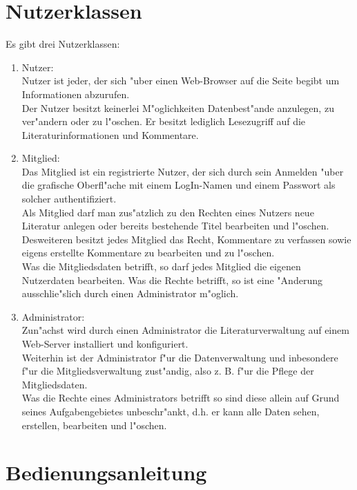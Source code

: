 \section{Nutzerklassen}
Es gibt drei Nutzerklassen:
\begin{enumerate}
\item Nutzer:\\
Nutzer ist jeder, der sich "uber einen Web-Browser auf die Seite begibt um Informationen abzurufen.\\
Der Nutzer besitzt keinerlei M"oglichkeiten Datenbest"ande anzulegen, zu ver"andern oder zu l"oschen. Er besitzt lediglich Lesezugriff auf die Literaturinformationen und Kommentare. \\

\item Mitglied:\\
Das Mitglied ist ein registrierte Nutzer, der sich durch sein Anmelden "uber die grafische Oberfl"ache mit einem LogIn-Namen und einem Passwort als solcher authentifiziert.\\
Als Mitglied darf man zus"atzlich zu den Rechten eines Nutzers neue Literatur anlegen oder bereits bestehende Titel bearbeiten und l"oschen.\\
Desweiteren besitzt jedes Mitglied das Recht, Kommentare zu verfassen sowie eigens erstellte Kommentare zu bearbeiten und zu l"oschen.\\
Was die Mitgliedsdaten betrifft, so darf jedes Mitglied die eigenen Nutzerdaten bearbeiten. Was die Rechte betrifft, so ist eine "Anderung ausschlie"slich durch einen Administrator m"oglich.\\

\item Administrator:\\
Zun"achst wird durch einen Administrator die Literaturverwaltung auf einem Web-Server installiert und konfiguriert.\\
Weiterhin ist der Administrator f"ur die Datenverwaltung und inbesondere f"ur die Mitgliedsverwaltung zust"andig, also z. B. f"ur die Pflege der Mitgliedsdaten.\\
Was die Rechte eines Administrators betrifft so sind diese allein auf Grund seines Aufgabengebietes unbeschr"ankt, d.h. er kann alle Daten sehen, erstellen, bearbeiten und l"oschen.\\ 

\end{enumerate}
\section{Bedienungsanleitung}
